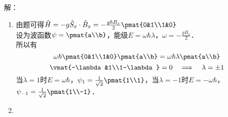 \subsection{ }
解：
\begin{enumerate}
\item 由题可得$\hat{H}=-g\hat{S}_x\cdot\hat{B}_x=-\frac{g\hbar B_x}{2}\pmat{0&1\\1&0} $\\
设为波函数$\psi=\pmat{a\\b}$，能级$E=\omega\hbar\lambda$，$\omega=-\frac{gB_x}{2}$．\\
所以有
\begin{equation}
\omega\hbar\pmat{0&1\\1&0}\pmat{a\\b}=\omega\hbar\lambda\pmat{a\\b}
\end{equation}
\begin{equation}
\vmat{-\lambda&1\\1-\lambda}=0\quad\Longrightarrow\quad\lambda=\pm1
\end{equation}
当$\lambda=1$时$E=\omega\hbar$，$\psi_1=\frac{1}{\sqrt{2}}\pmat{1\\1}$，当$\lambda=-1$时$E=-\omega\hbar$，$\psi_{-1}=\frac{1}{\sqrt{2}}\pmat{1\\-1}$．
\item 
\end{enumerate}